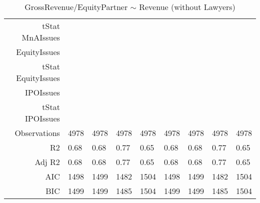 \begin{table}[ht]
\begin{tabular}{rllllllll}
  tStat MnAIssues &  &  &  &  &  &  &  &  \\ 
  EquityIssues &  &  &  &  &  &  &  &  \\ 
  tStat EquityIssues &  &  &  &  &  &  &  &  \\ 
  IPOIssues &  &  &  &  &  &  &  &  \\ 
  tStat IPOIssues &  &  &  &  &  &  &  &  \\ 
  Observations & 4978 & 4978 & 4978 & 4978 & 4978 & 4978 & 4978 & 4978 \\ 
  R2 & 0.68 & 0.68 & 0.77 & 0.65 & 0.68 & 0.68 & 0.77 & 0.65 \\ 
  Adj R2 & 0.68 & 0.68 & 0.77 & 0.65 & 0.68 & 0.68 & 0.77 & 0.65 \\ 
  AIC & 1498 & 1499 & 1482 & 1504 & 1498 & 1499 & 1482 & 1504 \\ 
  BIC & 1499 & 1499 & 1485 & 1504 & 1499 & 1499 & 1485 & 1504 \\ 
   \hline
\end{tabular}
\caption{GrossRevenue/EquityPartner $\sim$ Revenue (without Lawyers)} 
\end{table}
